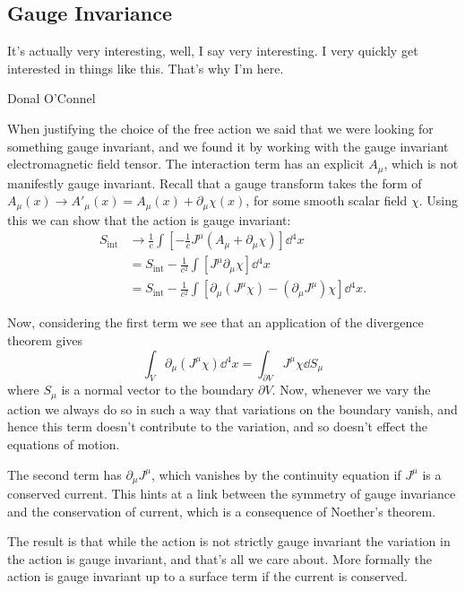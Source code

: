 \documentclass[fleqn]{NotesClass}
\begin{document}
    \subsection{Gauge Invariance}
    \epigraph{It's actually very interesting, well, I say very interesting. I very quickly get interested in things like this. That's why I'm here.}{Donal O'Connel}
    When justifying the choice of the free action we said that we were looking for something gauge invariant, and we found it by working with the gauge invariant electromagnetic field tensor.
    The interaction term has an explicit \(A_\mu\), which is not manifestly gauge invariant.
    Recall that a gauge transform takes the form of \(A_\mu(x) \to A'_\mu(x) = A_\mu(x) + \partial_\mu \chi(x)\), for some smooth scalar field \(\chi\).
    Using this we can show that the action is gauge invariant:
    \begin{align}
        S_{\text{int}} &\to \frac{1}{c}\int \left[ -\frac{1}{c} J^\mu(A_\mu + \partial_\mu \chi) \right] \dd{^4x}\\
        &= S_{\text{int}} - \frac{1}{c^2} \int \left[ J^\mu \partial_\mu \chi \right] \dd{^4x}\\
        &= S_{\text{int}} - \frac{1}{c^2} \int \left[  \partial_\mu(J^\mu \chi) - (\partial_\mu J^\mu)\chi \right] \dd{^4x}.
    \end{align}

    Now, considering the first term we see that an application of the divergence theorem gives
    \begin{equation}
        \int_{V} \partial_\mu(J^\mu \chi) \dd{^4x} = \int_{\partial V} J^\mu \chi \dd{S_\mu}
    \end{equation}
    where \(S_\mu\) is a normal vector to the boundary \(\partial V\).
    Now, whenever we vary the action we always do so in such a way that variations on the boundary vanish, and hence this term doesn't contribute to the variation, and so doesn't effect the equations of motion.
    
    The second term has \(\partial_\mu J^\mu\), which vanishes by the continuity equation if \(J^\mu\) is a conserved current.
    This hints at a link between the symmetry of gauge invariance and the conservation of current, which is a consequence of Noether's theorem.
    
    The result is that while the action is not strictly gauge invariant the variation in the action is gauge invariant, and that's all we care about.
    More formally the action is gauge invariant up to a surface term if the current is conserved.
    
\end{document}
